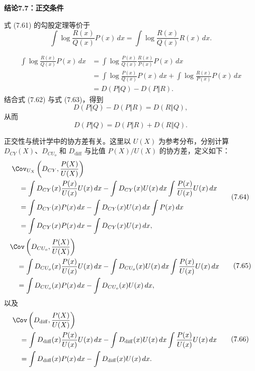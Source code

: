 \par\medskip{}\noindent\textbf{结论7.7：正交条件}\par
式 (7.61) 的勾股定理等价于
\begin{equation}
\int\log\frac{R(x)}{Q(x)}P(x)\,dx
=\int\log\frac{R(x)}{Q(x)}R(x)\,dx.
\tag{7.62}
\end{equation}
\begin{bookproof}
\begin{equation}
\begin{aligned}
\int\log\frac{R(x)}{Q(x)}P(x)\,dx
&=\int\log\frac{P(x)}{Q(x)}\frac{R(x)}{P(x)}P(x)\,dx\\
&=\int\log\frac{P(x)}{Q(x)}P(x)\,dx
+\int\log\frac{R(x)}{P(x)}P(x)\,dx\\
&=D(P\Vert Q)-D(P\Vert R).
\end{aligned}
\tag{7.63}
\end{equation}
结合式 (7.62) 与式 (7.63)，得到
\[
D(P\Vert Q)-D(P\Vert R)=D(R\Vert Q),
\]
从而
\[
D(P\Vert Q)=D(P\Vert R)+D(R\Vert Q).
\]
\nopagebreak[4]
\end{bookproof}

正交性与统计学中的协方差有关。这里以 $U(X)$ 为参考分布，分别计算 $D_{CY}(X)$、$D_{CU_o}$ 和 $D_{\mathrm{diff}}$ 与比值 $P(X)/U(X)$ 的协方差，定义如下：
\begin{equation}
\begin{aligned}
&\Cov_{U_X}\left(D_{CY},\frac{P(X)}{U(X)}\right)\\
&\quad=\int D_{CY}(x)\frac{P(x)}{U(x)}U(x)\,dx
-\int D_{CY}(x)U(x)\,dx\int\frac{P(x)}{U(x)}U(x)\,dx\\
&\quad=\int D_{CY}(x)P(x)\,dx
-\int D_{CY}(x)U(x)\,dx\int P(x)\,dx\\
&\quad=\int D_{CY}(x)P(x)\,dx-\int D_{CY}(x)U(x)\,dx,
\end{aligned}
\tag{7.64}
\end{equation}
\begin{equation}
\begin{aligned}
&\Cov\left(D_{CU_o},\frac{P(X)}{U(X)}\right)\\
&\quad=\int D_{CU_o}(x)\frac{P(x)}{U(x)}U(x)\,dx
-\int D_{CU_o}(x)U(x)\,dx\int\frac{P(x)}{U(x)}U(x)\,dx\\
&\quad=\int D_{CU_o}(x)P(x)\,dx-\int D_{CU_o}(x)U(x)\,dx,
\end{aligned}
\tag{7.65}
\end{equation}
以及
\begin{equation}
\begin{aligned}
&\Cov\left(D_{\mathrm{diff}},\frac{P(X)}{U(X)}\right)\\
&\quad=\int D_{\mathrm{diff}}(x)\frac{P(x)}{U(x)}U(x)\,dx
-\int D_{\mathrm{diff}}(x)U(x)\,dx\int\frac{P(x)}{U(x)}U(x)\,dx\\
&\quad=\int D_{\mathrm{diff}}(x)P(x)\,dx-\int D_{\mathrm{diff}}(x)U(x)\,dx.
\end{aligned}
\tag{7.66}
\end{equation}

